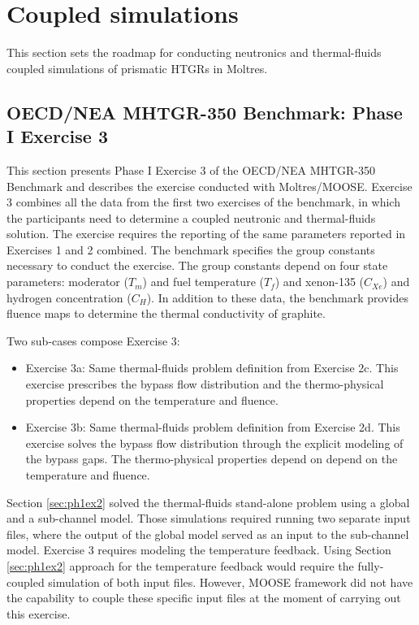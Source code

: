 \section{Coupled simulations}
\label{sec:thermal-coupling}

This section sets the roadmap for conducting neutronics and thermal-fluids coupled simulations of prismatic HTGRs in Moltres.

\subsection{OECD/NEA MHTGR-350 Benchmark: Phase I Exercise 3}
\label{sec:ph1ex3}

This section presents Phase I Exercise 3 of the OECD/NEA MHTGR-350 Benchmark and describes the exercise conducted with Moltres/MOOSE.
Exercise 3 combines all the data from the first two exercises of the benchmark, in which the participants need to determine a coupled neutronic and thermal-fluids solution.
The exercise requires the reporting of the same parameters reported in Exercises 1 and 2 combined.
The benchmark specifies the group constants necessary to conduct the exercise.
The group constants depend on four state parameters: moderator ($T_m$) and fuel temperature ($T_f$) and xenon-135 ($C_{Xe}$) and hydrogen concentration ($C_H$).
In addition to these data, the benchmark provides fluence maps to determine the thermal conductivity of graphite.

Two sub-cases compose Exercise 3:
\begin{itemize}
  \item Exercise 3a: Same thermal-fluids problem definition from Exercise 2c. This exercise prescribes the bypass flow distribution and the thermo-physical properties depend on the temperature and fluence.
  \item Exercise 3b: Same thermal-fluids problem definition from Exercise 2d. This exercise solves the bypass flow distribution through the explicit modeling of the bypass gaps. The thermo-physical properties depend on depend on the temperature and fluence.
\end{itemize}

Section \ref{sec:ph1ex2} solved the thermal-fluids stand-alone problem using a global and a sub-channel model.
Those simulations required running two separate input files, where the output of the global model served as an input to the sub-channel model.
Exercise 3 requires modeling the temperature feedback.
Using Section \ref{sec:ph1ex2} approach for the temperature feedback would require the fully-coupled simulation of both input files.
However, MOOSE framework did not have the capability to couple these specific input files at the moment of carrying out this exercise.

